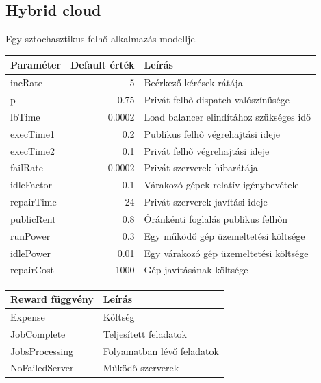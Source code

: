 \subsection{Hybrid cloud}

Egy sztochasztikus felhő alkalmazás modellje.
\begin{center}
	\begin{tabular}{lrl}
		\textbf{\textbf{Paraméter}} & \textbf{Default érték} & \textbf{Leírás} \\
		\hline
		incRate & 5& Beérkező kérések rátája\\
		p & 0.75 & Privát felhő dispatch valószínűsége\\
		lbTime & 0.0002 & Load balancer elindítához szükséges idő\\
		execTime1 & 0.2 & Publikus felhő végrehajtási ideje\\
		execTime2 & 0.1 & Privát felhő végrehajtási ideje\\
		failRate & 0.0002 & Privát szerverek hibarátája\\
		idleFactor & 0.1 & Várakozó gépek relatív igénybevétele\\
		repairTime & 24 & Privát szerverek javítási ideje\\
		publicRent & 0.8 & Óránkénti foglalás publikus felhőn\\
		runPower & 0.3 & Egy működő gép üzemeltetési költsége\\
		idlePower & 0.01 & Egy várakozó gép üzemeltetési költsége\\
		repairCost & 1000 & Gép javításának költsége\\
	\end{tabular}
	\quad
	\begin{tabular}{ll}
		\textbf{\textbf{Reward függvény}} & \textbf{Leírás}\\
		\hline
		Expense & Költség\\
		JobComplete & Teljesített feladatok\\
		JobsProcessing & Folyamatban lévő feladatok\\
		NoFailedServer & Működő szerverek\\
	\end{tabular}
\end{center}

